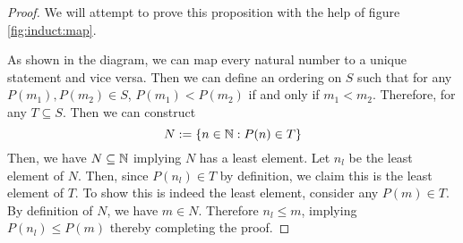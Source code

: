 \begin{proof}
	We will attempt to prove this proposition with the help of figure \eqref{fig:induct:map}.
	\begin{figure}[h]
	\centering
		\caption{}
		\label{fig:induct:map}
	\end{figure}
	As shown in the diagram, we can map every natural number to a unique statement and vice versa.
	Then we can define an ordering on $S$ such that for any $P(m_1),P(m_2)\in S$, $P(m_1)<P(m_2)$ if and only if $m_1<m_2$.
	Therefore, for any $T\subseteq S$.
	Then we can construct
	$$N:=\{n\in \mathbb{N}: P(n)\in T\}$$
	Then, we have $N\subseteq \mathbb{N}$ implying $N$ has a least element. Let $n_l$ be the least element of $N$.
	Then, since $P(n_l)\in T$ by definition, we claim this is the least element of $T$.
	To show this is indeed the least element, consider any $P(m)\in T$. By definition of $N$, we have $m\in N$. Therefore $n_l\le m$, implying $P(n_l)\le P(m)$ thereby completing the proof.
\end{proof}

